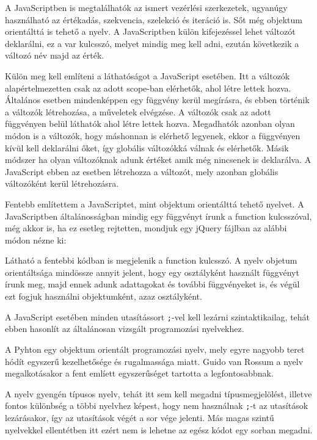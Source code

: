 A JavaScriptben is megtalálhatók az ismert vezérlési szerkezetek, ugyanúgy használható az értékadás, szekvencia, szelekció és iteráció is. Sőt még objektum orientálttá is tehető a nyelv. A JavaScriptben külön kifejezéssel lehet változót deklarálni, ez a var kulcsszó, melyet mindig meg kell adni, ezután következik a változó név majd az érték.

Külön meg kell említeni a láthatóságot a JavaScript esetében. Itt a változók alapértelmezetten csak az adott scope-ban elérhetők, ahol létre lettek hozva. Általános esetben mindenképpen egy függvény kerül megírásra, és ebben történik a változók létrehozása, a műveletek elvégzése. A változók csak az adott függvényen belül láthatók ahol létre lettek hozva. Megadhatók azonban olyan módon is a változók, hogy máshonnan is elérhető legyenek, ekkor a függvényen kívül kell deklarálni őket, így globális változókká válnak és elérhetők. Másik módszer ha olyan változóknak adunk értéket amik még nincsenek is deklarálva. A JavaScript ebben az esetben létrehozza a változót, mely azonban globális változóként kerül létrehozásra.

Fentebb említettem a JavaScriptet, mint objektum orientálttá tehető nyelvet. A JavaScriptben általánosságban mindig egy függvényt írunk a function kulcsszóval, még akkor is, ha ez esetleg rejtetten, mondjuk egy jQuery fájlban az alábbi módon nézne ki:


Látható a fentebbi kódban is megjelenik a function kulcsszó. A nyelv objetum orientáltsága mindössze annyit jelent, hogy egy osztályként használt függvényt írunk meg, majd ennek adunk adattagokat és további függvényeket is, és végül ezt fogjuk használni objektumként, azaz osztályként.

A JavaScript esetében minden utasítássort \texttt{;}-vel kell lezárni szintaktikailag, tehát ebben hasonlít az általánosan vizsgált programozási nyelvekhez.

A Pyhton egy objektum orientált programozási nyelv, mely egyre nagyobb teret hódít egyszerű kezelhetősége és rugalmassága miatt. Guido van Rossum a nyelv megalkotásakor a fent emlíett egyszerűséget tartotta a legfontosabbnak.

A nyelv gyengén típusos nyelv, tehát itt sem kell megadni típusmegjelölést, illetve fontos különbség a többi nyelvhez képest, hogy nem használnak \texttt{;}-t az utasítások lezárásakor, így az utasítások végét a sor vége jelenti. Más magas szintű nyelvekkel ellentétben itt ezért nem is lehetne az egész kódot egy sorban megadni.

